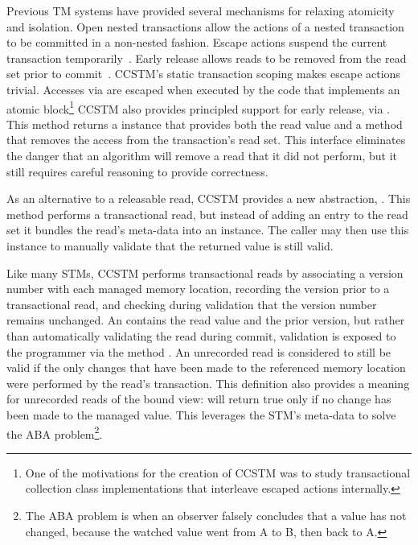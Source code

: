 Previous TM systems have provided several mechanisms for relaxing atomicity and
isolation.
Open nested transactions allow the actions of a
nested transaction to be committed in a non-nested fashion.  Escape actions
suspend the current transaction temporarily~\cite{harris04exceptions}.  Early
release
allows reads to be removed from the read set prior to
commit~\cite{HerlihyLMS03}.  CCSTM's static transaction scoping makes escape
actions trivial.  Accesses via  are escaped when executed by the
code that implements an atomic block\footnote{One of the motivations for the
creation of CCSTM was to study transactional collection class implementations
that interleave escaped actions internally.}
CCSTM also provides principled support for
early release, via .  This method returns
a  instance that provides both the read value
and a method that removes the access from the transaction's read set.
This interface eliminates the danger that an algorithm will remove a
read that it did not perform, but it still requires careful reasoning to
provide correctness.

As an alternative to a releasable read, CCSTM provides a new
abstraction, .  This method performs a
transactional read, but instead of adding an entry to the read set it
bundles the read's meta-data into an  instance.
The caller may then use this instance to manually validate that the
returned value is still valid.

Like many STMs, CCSTM performs transactional reads by associating a
version number with each managed memory location, recording the version
prior to a transactional read, and checking during validation that the
version number remains unchanged.  An  contains the
read value and the prior version, but rather than automatically validating
the read during commit, validation is exposed to the programmer via the
method .  An unrecorded read is considered to still be
valid if the only changes that have been made to the referenced memory
location were performed by the read's transaction.  This definition also
provides a meaning for unrecorded reads of the  bound view:
 will return true only if no change has been made to the
managed value.  This leverages the STM's meta-data to solve
the ABA problem\footnote{The ABA problem is when an observer falsely
concludes that a value has not changed, because the watched value went
from A to B, then back to A.}.

